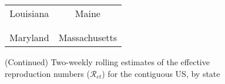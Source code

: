 \documentclass[12pt]{article}
\begin{document}
\begin{figure}[!p]%
\caption
{(Continued) Two-weekly rolling estimates of the effective reproduction numbers ($\mathcal
{R}_{et}$) for the contiguous US, by state}%
\vspace{-0.3cm}%


\begin{center}%
\hspace*{-0.2cm}%
\begin{tabular}
[c]{cc}%
{\footnotesize Louisiana} & {\footnotesize Maine}\\%
{\includegraphics[
height=1.7763in,
width=3.5293in
]%
{figs/US-Re-LA-2W.png}%
}
&
{\includegraphics[
height=1.7763in,
width=3.5293in
]%
{figs/US-Re-ME-2W.png}%
}
\\
& \\
{\footnotesize Maryland} & {\footnotesize Massachusetts}\\%

\end{tabular}
\end{center}
\end{figure}
\end{document}
